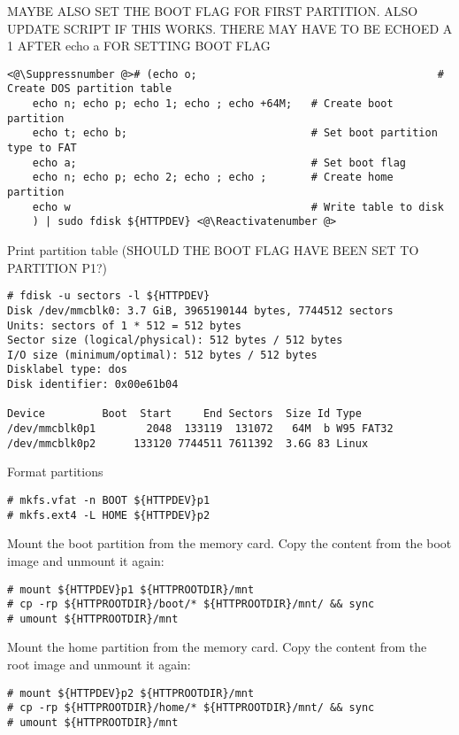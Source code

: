 MAYBE ALSO SET THE BOOT FLAG FOR FIRST PARTITION. ALSO UPDATE SCRIPT IF THIS
WORKS. THERE MAY HAVE TO BE ECHOED A 1 AFTER echo a FOR SETTING BOOT FLAG
\begin{lstlisting}[]
<@\Suppressnumber @># (echo o;                                      # Create DOS partition table
    echo n; echo p; echo 1; echo ; echo +64M;   # Create boot partition
    echo t; echo b;                             # Set boot partition type to FAT
    echo a;                                     # Set boot flag
    echo n; echo p; echo 2; echo ; echo ;       # Create home partition
    echo w                                      # Write table to disk
    ) | sudo fdisk ${HTTPDEV} <@\Reactivatenumber @>
\end{lstlisting}
\FloatBarrier
\vspace{-5mm}

Print partition table (SHOULD THE BOOT FLAG HAVE BEEN SET TO PARTITION P1?)
\begin{lstlisting}[]
# fdisk -u sectors -l ${HTTPDEV}
Disk /dev/mmcblk0: 3.7 GiB, 3965190144 bytes, 7744512 sectors
Units: sectors of 1 * 512 = 512 bytes
Sector size (logical/physical): 512 bytes / 512 bytes
I/O size (minimum/optimal): 512 bytes / 512 bytes
Disklabel type: dos
Disk identifier: 0x00e61b04

Device         Boot  Start     End Sectors  Size Id Type
/dev/mmcblk0p1        2048  133119  131072   64M  b W95 FAT32
/dev/mmcblk0p2      133120 7744511 7611392  3.6G 83 Linux
\end{lstlisting}
\FloatBarrier
\vspace{-5mm}

Format partitions
\begin{lstlisting}[]
# mkfs.vfat -n BOOT ${HTTPDEV}p1
# mkfs.ext4 -L HOME ${HTTPDEV}p2
\end{lstlisting}
\FloatBarrier
\vspace{-5mm}






Mount the boot partition from the memory card. Copy the content from the
boot image and unmount it again:
\begin{lstlisting}[]
# mount ${HTTPDEV}p1 ${HTTPROOTDIR}/mnt
# cp -rp ${HTTPROOTDIR}/boot/* ${HTTPROOTDIR}/mnt/ && sync
# umount ${HTTPROOTDIR}/mnt
\end{lstlisting}
\FloatBarrier
\vspace{-5mm}

Mount the home partition from the memory card. Copy the content from the
root image and unmount it again:
\begin{lstlisting}[]
# mount ${HTTPDEV}p2 ${HTTPROOTDIR}/mnt
# cp -rp ${HTTPROOTDIR}/home/* ${HTTPROOTDIR}/mnt/ && sync
# umount ${HTTPROOTDIR}/mnt
\end{lstlisting}
\FloatBarrier
\vspace{-5mm}


